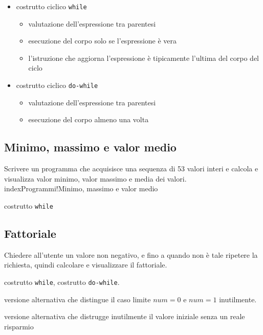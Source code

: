\begin{itemize}
\item costrutto ciclico \texttt{while}
    \begin{itemize}
    \item valutazione dell'espressione tra parentesi
    \item esecuzione del corpo solo se l'espressione \`e vera
    \item l'istruzione che aggiorna l'espressione  \`e tipicamente l'ultima del corpo del ciclo
    \end{itemize}
\item costrutto ciclico \texttt{do-while}
    \begin{itemize}
    \item valutazione dell'espressione tra parentesi
    \item esecuzione del corpo almeno una volta 
    \end{itemize}
\end{itemize}

\mysep{}

\subsection{Minimo, massimo e valor medio}
Scrivere un programma che acquisisce una sequenza di 53 valori interi e calcola e visualizza valor minimo, valor massimo e media dei valori.\\index{Programmi!Minimo, massimo e valor medio} 

\begin{tags}
costrutto \texttt{while}
\end{tags}



\subsection{Fattoriale}
Chiedere all'utente un valore non negativo, e fino a quando non \`e tale ripetere la richiesta, quindi calcolare e visualizzare il fattoriale.

\begin{tags}
costrutto \texttt{while}, costrutto \texttt{do-while}.
\end{tags}



versione alternativa che distingue il caso limite $num=0$ e $num=1$ inutilmente.



versione alternativa che distrugge inutilmente il valore iniziale senza un reale risparmio



